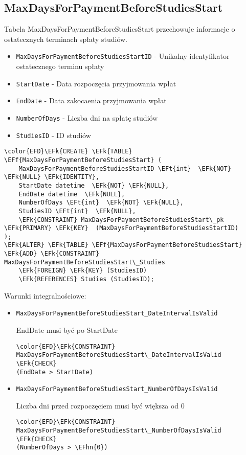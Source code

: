 \documentclass[11pt]{article}
\newcommand{\EFk}[1]{\textcolor{EFk}{\textbf{#1}}} %
\newcommand{\EFf}[1]{\textcolor{EFf}{#1}} %
\newcommand{\EFt}[1]{\textcolor{EFt}{\textbf{#1}}} %
\newcommand{\EFhn}[1]{\textcolor{EFhn}{#1}} %
\begin{document}
\subsection{MaxDaysForPaymentBeforeStudiesStart}
\label{sec:org0791f07}
Tabela MaxDaysForPaymentBeforeStudiesStart przechowuje informacje o ostatecznych terminach spłaty studiów.
\begin{itemize}
\item \texttt{MaxDaysForPaymentBeforeStudiesStartID} - Unikalny identyfikator ostatecznego terminu spłaty
\item \texttt{StartDate} - Data rozpoczęcia przyjmowania wpłat
\item \texttt{EndDate} - Data zakocaenia przyjmowania wpłat
\item \texttt{NumberOfDays} - Liczba dni na spłatę studiów
\item \texttt{StudiesID} - ID studiów
\end{itemize}
\begin{Code}
\begin{Verbatim}
\color{EFD}\EFk{CREATE} \EFk{TABLE} \EFf{MaxDaysForPaymentBeforeStudiesStart} (
    MaxDaysForPaymentBeforeStudiesStartID \EFt{int}  \EFk{NOT} \EFk{NULL} \EFk{IDENTITY},
    StartDate datetime  \EFk{NOT} \EFk{NULL},
    EndDate datetime  \EFk{NULL},
    NumberOfDays \EFt{int}  \EFk{NOT} \EFk{NULL},
    StudiesID \EFt{int}  \EFk{NULL},
    \EFk{CONSTRAINT} MaxDaysForPaymentBeforeStudiesStart\_pk \EFk{PRIMARY} \EFk{KEY}  (MaxDaysForPaymentBeforeStudiesStartID)
);
\EFk{ALTER} \EFk{TABLE} \EFf{MaxDaysForPaymentBeforeStudiesStart} \EFk{ADD} \EFk{CONSTRAINT} MaxDaysForPaymentBeforeStudiesStart\_Studies
    \EFk{FOREIGN} \EFk{KEY} (StudiesID)
    \EFk{REFERENCES} Studies (StudiesID);
\end{Verbatim}
\end{Code}
Warunki integralnościowe:


\begin{itemize}
\item \texttt{MaxDaysForPaymentBeforeStudiesStart\_DateIntervalIsValid}

EndDate musi być po StartDate
\begin{Code}
\begin{Verbatim}
\color{EFD}\EFk{CONSTRAINT} MaxDaysForPaymentBeforeStudiesStart\_DateIntervalIsValid \EFk{CHECK}
(EndDate > StartDate)
\end{Verbatim}
\end{Code}
\item \texttt{MaxDaysForPaymentBeforeStudiesStart\_NumberOfDaysIsValid}

Liczba dni przed rozpoczęciem musi być większa od 0
\begin{Code}
\begin{Verbatim}
\color{EFD}\EFk{CONSTRAINT} MaxDaysForPaymentBeforeStudiesStart\_NumberOfDaysIsValid \EFk{CHECK}
(NumberOfDays > \EFhn{0})
\end{Verbatim}
\end{Code}
\end{itemize}
\end{document}
